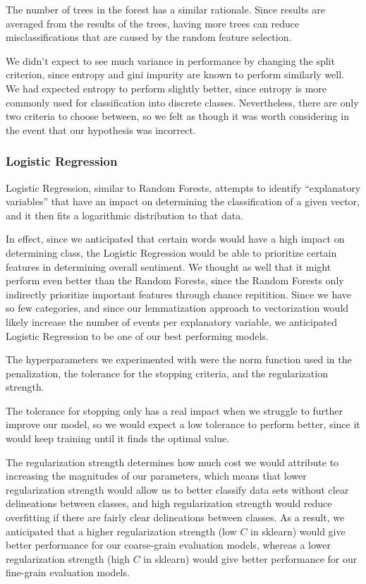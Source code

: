 \documentclass[conference]{IEEEtran}
\begin{document}
The number of trees in the forest has a similar rationale. Since results are averaged from the results of the trees, having more trees can reduce misclassifications that are caused by the random feature selection.

We didn't expect to see much variance in performance by changing the split criterion, since entropy and gini impurity are known to perform similarly well. We had expected entropy to perform slightly better, since entropy is more commonly used for classification into discrete classes. Nevertheless, there are only two criteria to choose between, so we felt as though it was worth considering in the event that our hypothesis was incorrect.

\subsubsection{Logistic Regression}

Logistic Regression, similar to Random Forests, attempts to identify ``explanatory variables'' that have an impact on determining the classification of a given vector, and it then fits a logarithmic distribution to that data.

In effect, since we anticipated that certain words would have a high impact on determining class, the Logistic Regression would be able to prioritize certain features in determining overall sentiment. We thought as well that it might perform even better than the Random Forests, since the Random Forests only indirectly prioritize important features through chance repitition. Since we have so few categories, and since our lemmatization approach to vectorization would likely increase the number of events per explanatory variable, we anticipated Logistic Regression to be one of our best performing models.

The hyperparameters we experimented with were the norm function used in the penalization, the tolerance for the stopping criteria, and the regularization strength.

The tolerance for stopping only has a real impact when we struggle to further improve our model, so we would expect a low tolerance to perform better, since it would keep training until it finds the optimal value.

The regularization strength determines how much cost we would attribute to increasing the magnitudes of our parameters, which means that lower regularization strength would allow us to better classify data sets without clear delineations between classes, and high regularization strength would reduce overfitting if there are fairly clear delineations between classes. As a result, we anticipated that a higher regularization strength (low $C$ in sklearn) would give better performance for our coarse-grain evaluation models, whereas a lower regularization strength (high $C$ in sklearn) would give better performance for our fine-grain evaluation models.
\end{document}
